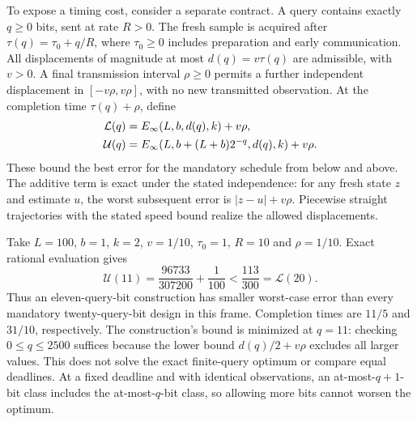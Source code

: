 To expose a timing cost, consider a separate contract. A query contains exactly $q\geq0$ bits, sent at rate $R>0$. The fresh sample is acquired after $\tau(q)=\tau_0+q/R$, where $\tau_0\geq0$ includes preparation and early communication. All displacements of magnitude at most $d(q)=v\tau(q)$ are admissible, with $v>0$. A final transmission interval $\rho\geq0$ permits a further independent displacement in $[-v\rho,v\rho]$, with no new transmitted observation. At the completion time $\tau(q)+\rho$, define
\begin{align}\label{B-eq:timing}
\mathcal L(q)&=E_{\infty}(L,b,d(q),k)+v\rho,\notag\\
\mathcal U(q)&=E_{\infty}(L,b+(L+b)2^{-q},d(q),k)+v\rho.
\end{align}
These bound the best error for the mandatory schedule from below and above. The additive term is exact under the stated independence: for any fresh state $z$ and estimate $u$, the worst subsequent error is $|z-u|+v\rho$. Piecewise straight trajectories with the stated speed bound realize the allowed displacements.

Take $L=100$, $b=1$, $k=2$, $v=1/10$, $\tau_0=1$, $R=10$ and $\rho=1/10$. Exact rational evaluation gives
\begin{equation}\label{B-eq:example}
\mathcal U(11)=\frac{96733}{307200}+\frac1{100}<\frac{113}{300}=\mathcal L(20).
\end{equation}
Thus an eleven-query-bit construction has smaller worst-case error than every mandatory twenty-query-bit design in this frame. Completion times are $11/5$ and $31/10$, respectively. The construction's bound is minimized at $q=11$: checking $0\leq q\leq2500$ suffices because the lower bound $d(q)/2+v\rho$ excludes all larger values. This does not solve the exact finite-query optimum or compare equal deadlines. At a fixed deadline and with identical observations, an at-most-$q+1$-bit class includes the at-most-$q$-bit class, so allowing more bits cannot worsen the optimum.
